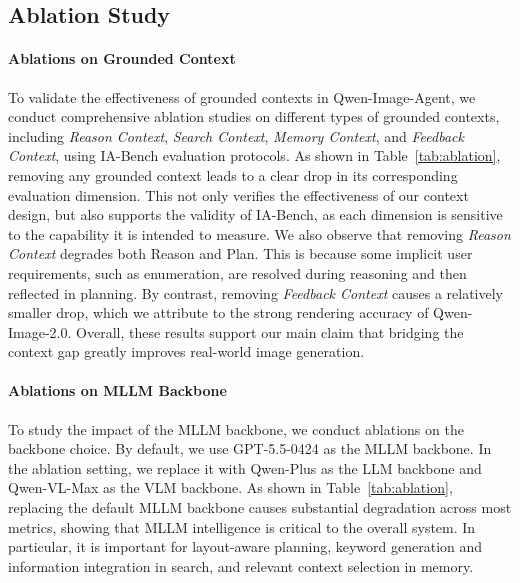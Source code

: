 
\subsection{Ablation Study}
\paragraph{Ablations on Grounded Context}
To validate the effectiveness of grounded contexts in Qwen-Image-Agent, we conduct comprehensive ablation studies on different types of grounded contexts, including \textit{Reason Context}, \textit{Search Context}, \textit{Memory Context}, and \textit{Feedback Context}, using IA-Bench evaluation protocols. As shown in Table~\ref{tab:ablation}, removing any grounded context leads to a clear drop in its corresponding evaluation dimension. This not only verifies the effectiveness of our context design, but also supports the validity of IA-Bench, as each dimension is sensitive to the capability it is intended to measure. We also observe that removing \textit{Reason Context} degrades both Reason and Plan. This is because some implicit user requirements, such as enumeration, are resolved during reasoning and then reflected in planning. By contrast, removing \textit{Feedback Context} causes a relatively smaller drop, which we attribute to the strong rendering accuracy of Qwen-Image-2.0. Overall, these results support our main claim that bridging the context gap greatly improves real-world image generation.

\paragraph{Ablations on MLLM Backbone}
To study the impact of the MLLM backbone, we conduct ablations on the backbone choice. By default, we use GPT-5.5-0424 as the MLLM backbone. In the ablation setting, we replace it with Qwen-Plus as the LLM backbone and Qwen-VL-Max as the VLM backbone. As shown in Table~\ref{tab:ablation}, replacing the default MLLM backbone causes substantial degradation across most metrics, showing that MLLM intelligence is critical to the overall system. In particular, it is important for layout-aware planning, keyword generation and information integration in search, and relevant context selection in memory.

